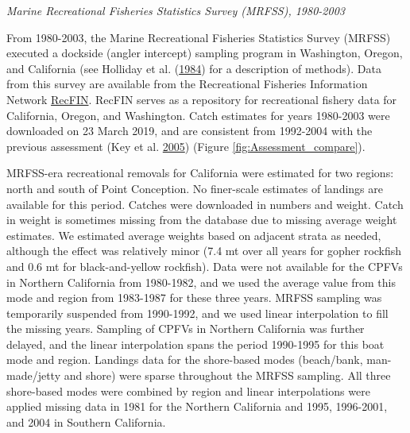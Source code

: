 \documentclass[12pt,]{article}
\begin{document}
\emph{Marine Recreational Fisheries Statistics Survey (MRFSS),
1980-2003}

From 1980-2003, the Marine Recreational Fisheries Statistics Survey
(MRFSS) executed a dockside (angler intercept) sampling program in
Washington, Oregon, and California (see Holliday et al.
(\protect\hyperlink{ref-Holliday1984}{1984}) for a description of
methods). Data from this survey are available from the Recreational
Fisheries Information Network \href{www.recfin.org}{RecFIN}. RecFIN
serves as a repository for recreational fishery data for California,
Oregon, and Washington. Catch estimates for years 1980-2003 were
downloaded on 23 March 2019, and are consistent from 1992-2004 with the
previous assessment (Key et al. \protect\hyperlink{ref-Key2005}{2005})
(Figure \ref{fig:Assessment_compare}).

MRFSS-era recreational removals for California were estimated for two
regions: north and south of Point Conception. No finer-scale estimates
of landings are available for this period. Catches were downloaded in
numbers and weight. Catch in weight is sometimes missing from the
database due to missing average weight estimates. We estimated average
weights based on adjacent strata as needed, although the effect was
relatively minor (7.4 mt over all years for gopher rockfish and 0.6 mt
for black-and-yellow rockfish). Data were not available for the CPFVs in
Northern California from 1980-1982, and we used the average value from
this mode and region from 1983-1987 for these three years. MRFSS
sampling was temporarily suspended from 1990-1992, and we used linear
interpolation to fill the missing years. Sampling of CPFVs in Northern
California was further delayed, and the linear interpolation spans the
period 1990-1995 for this boat mode and region. Landings data for the
shore-based modes (beach/bank, man-made/jetty and shore) were sparse
throughout the MRFSS sampling. All three shore-based modes were combined
by region and linear interpolations were applied missing data in 1981
for the Northern California and 1995, 1996-2001, and 2004 in Southern
California.
\end{document}
